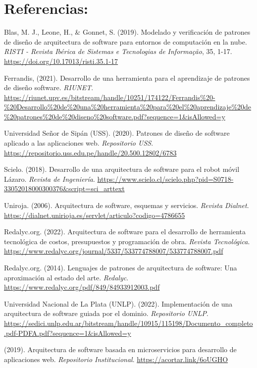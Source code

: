 \documentclass[twocolumn]{article}
\begin{document}
\section{Referencias:}
Blas, M. J., Leone, H., \& Gonnet, S. (2019). Modelado y verificación de patrones de diseño de arquitectura de software para entornos de computación en la nube. \textit{RISTI - Revista Ibérica de Sistemas e Tecnologias de Informação}, 35, 1-17. \url{https://doi.org/10.17013/risti.35.1-17}

Ferrandis, (2021). Desarrollo de una herramienta para el aprendizaje de patrones de diseño software. \textit{RIUNET}. \url{https://riunet.upv.es/bitstream/handle/10251/174122/Ferrandis%20-%20Desarrollo%20de%20una%20herramienta%20para%20el%20aprendizaje%20de%20patrones%20de%20diseno%20software.pdf?sequence=1&isAllowed=y}

Universidad Señor de Sipán (USS). (2020). Patrones de diseño de software aplicado a las aplicaciones web. \textit{Repositorio USS}. \url{https://repositorio.uss.edu.pe/handle/20.500.12802/6783}

Scielo. (2018). Desarrollo de una arquitectura de software para el robot móvil Lázaro. \textit{Revista de Ingeniería}. \url{https://www.scielo.cl/scielo.php?pid=S0718-33052018000300376&script=sci_arttext}

Uniroja. (2006). Arquitectura de software, esquemas y servicios. \textit{Revista Dialnet}. \url{https://dialnet.unirioja.es/servlet/articulo?codigo=4786655}

Redalyc.org. (2022). Arquitectura de software para el desarrollo de herramienta tecnológica de costos, presupuestos y programación de obra. \textit{Revista Tecnológica}. \url{https://www.redalyc.org/journal/5337/533774788007/533774788007.pdf}

Redalyc.org. (2014). Lenguajes de patrones de arquitectura de software: Una aproximación al estado del arte. \textit{Redalyc}. \url{https://www.redalyc.org/pdf/849/84933912003.pdf}

Universidad Nacional de La Plata (UNLP). (2022). Implementación de una arquitectura de software guiada por el dominio. \textit{Repositorio UNLP}. \url{https://sedici.unlp.edu.ar/bitstream/handle/10915/115198/Documento_completo.pdf-PDFA.pdf?sequence=1&isAllowed=y}

(2019). Arquitectura de software basada en microservicios para desarrollo de aplicaciones web. \textit{Repositorio Institucional}. \url{https://acortar.link/6oUGHO}
\end{document}

